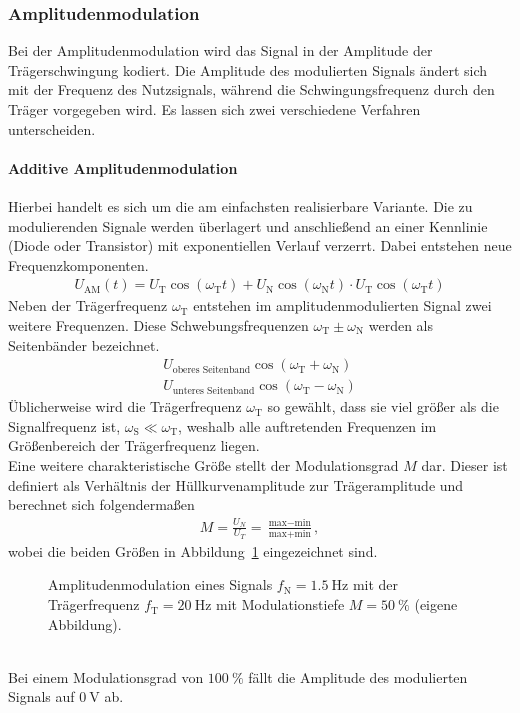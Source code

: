 \documentclass[a4paper,twoside,final]{article}
\begin{document}
\subsubsection{Amplitudenmodulation}
Bei der Amplitudenmodulation wird das Signal in der Amplitude der Trägerschwingung kodiert. Die Amplitude des modulierten Signals ändert sich mit der Frequenz des Nutzsignals, während die Schwingungsfrequenz durch den Träger vorgegeben wird. Es lassen sich zwei verschiedene Verfahren unterscheiden.
\paragraph{Additive Amplitudenmodulation}
Hierbei handelt es sich um die am einfachsten realisierbare Variante. Die zu modulierenden Signale werden überlagert und anschließend an einer Kennlinie (Diode oder Transistor) mit exponentiellen Verlauf verzerrt. Dabei entstehen neue Frequenzkomponenten.
\begin{align}
  U_\text{AM}(t) = U_\text{T}\cos(\omega_\text{T}t) + U_\text{N}\cos(\omega_\text{N}t)\cdot U_\text{T}\cos(\omega_\text{T}t)
\end{align}
Neben der Trägerfrequenz $\omega_\text{T}$ entstehen im amplitudenmodulierten Signal zwei weitere Frequenzen. Diese Schwebungsfrequenzen $\omega_\text{T} \pm \omega_\text{N}$ werden als Seitenbänder bezeichnet.
\begin{align}
  U_\text{oberes Seitenband}\cos(\omega_\text{T} + \omega_\text{N})\\
  U_\text{unteres Seitenband}\cos(\omega_\text{T} - \omega_\text{N})
\end{align}
Üblicherweise wird die Trägerfrequenz $\omega_\text{T}$ so gewählt, dass sie viel größer als die Signalfrequenz ist, $\omega_\text{S} \ll \omega_\text{T}$, weshalb alle auftretenden Frequenzen im Größenbereich der Trägerfrequenz liegen.\\
Eine weitere charakteristische Größe stellt der Modulationsgrad $M$ dar. Dieser ist definiert als Verhältnis der Hüllkurvenamplitude zur Trägeramplitude und berechnet sich folgendermaßen
\begin{align}
  M = \frac{U_N}{U_T} = \frac{\text{max}-\text{min}}{\text{max}+\text{min}},
\end{align}
wobei die beiden Größen in Abbildung~\ref{fig:Amplitudenmodulation} eingezeichnet sind.
\begin{figure}[htp]
    \centering
        
    \caption{Amplitudenmodulation eines Signals $f_\text{N} = \SI{1.5}{\hertz}$ mit der Trägerfrequenz $f_\text{T} = \SI{20}{\hertz}$ mit Modulationstiefe $M = \SI{50}{\percent}$ (eigene Abbildung).}
    \label{fig:Amplitudenmodulation}
\end{figure}\\
Bei einem Modulationsgrad von $\SI{100}{\percent}$ fällt die Amplitude des modulierten Signals auf $\SI{0}{\volt}$ ab.
\end{document}
